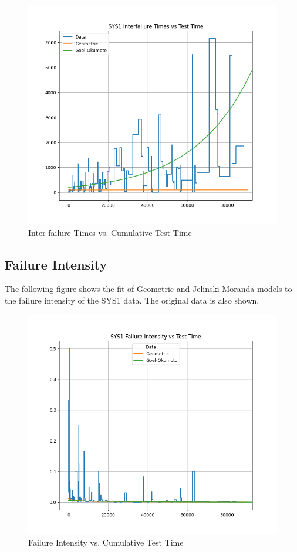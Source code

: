 \documentclass{article}
\begin{document}
\begin{figure}[h!]
\centering
\includegraphics[width=\textwidth]{ifplot2.png}
\caption{Inter-failure Times vs. Cumulative Test Time}
\label{fig:mifplot}
\end{figure}



\newpage

\subsection{Failure Intensity}
The following figure shows the fit of Geometric and Jelinski-Moranda models to the failure intensity of the SYS1 data. The original data is also shown.

\begin{figure}[h!]
\centering
\includegraphics[width=\textwidth]{fiplot2.png}
\caption{Failure Intensity vs. Cumulative Test Time}
\label{fig:mfiplot}
\end{figure}
\end{document}

